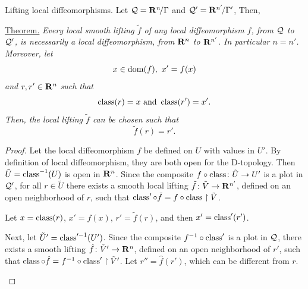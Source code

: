 \begin{Article}{Lifting local diffeomorphisms.}{}
  \label{Lifting-Local-Diffeomorphisms}
  Let $\mathcal{Q} = \mathbf{R}^n\!/\Gamma$ and $\mathcal{Q}' = \mathbf{R}^{n'}\!/\Gamma'$,
  Then,

  \uline{Theorem.} {\itshape Every local smooth lifting $\tilde f$ of any local diffeomorphism $f$,
  from $\mathcal{Q}$ to $\mathcal{Q}'$,
  is necessarily a local diffeomorphism,
  from $\mathbf{R}^n$ to $\mathbf{R}^{n'}$.
  In particular $n = n'$.
  Moreover,
  let
  $$
    x \in \mathrm{dom}(f), \ x' = f(x)
  $$
  and $r, r' \in \mathbf{R}^n$ such that
  $$
    \operatorname{class}(r) = x \ \text{and}\  \operatorname{class}(r') = x'.
  $$
  Then,
  the local lifting $\tilde f$ can be chosen such that
  $$
    \tilde f(r) = r'.
  $$
  }
\end{Article} %

\begin{proof}
  Let the local diffeomorphism $f$ be defined on $U$ with values in $U'$.
  By definition of local diffeomorphism,
  they are both open for the D-topology.
  Then $\tilde U = \operatorname{class}^{-1}(U)$ is open in $\mathbf{R}^n$.
  Since the composite $f \circ \operatorname{class} \colon \tilde U \to U'$ is a plot in $\mathcal{Q}'$,
  for all $r \in \tilde U$ there exists a smooth local lifting $\tilde f \colon \tilde V \to \mathbf{R}^{n'}$,
  defined on an open neighborhood of $r$,
  such that $\operatorname{class}' \circ \tilde f = f \circ \operatorname{class} \restriction \tilde V$.
  \begin{center}
  \end{center}
  Let $x = \operatorname{class}(r)$,
  $x' = f(x)$,
  $r' = \tilde f(r)$,
  and then $x' = \operatorname{class}'(r')$.

  Next,
  let $\tilde U' = \operatorname{class}'^{-1}(U')$.
  Since the composite $f^{-1} \circ \operatorname{class}'$ is a plot in $\mathcal{Q}$,
  there exists a smooth lifting $\hat f \colon \tilde V' \to \mathbf{R}^n$,
  defined on an open neighborhood of $r'$,
  such that $\operatorname{class} \circ \hat f = f^{-1} \circ \operatorname{class}' \restriction \tilde V'$.
  Let $r'' = \hat f(r')$,
  which can be different from $r$.

  \begin{center}
  \end{center}


\end{proof}
